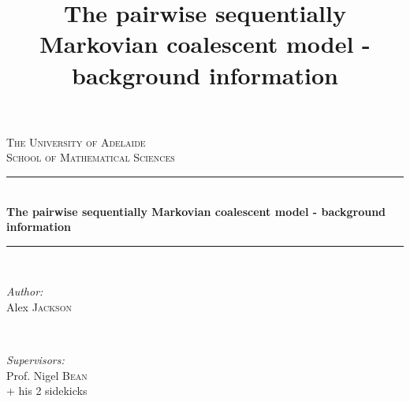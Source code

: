 \documentclass[12pt]{article}
\newcommand{\HRule}{\rule{\linewidth}{0.5mm}} %
\begin{document}
%
%


\title{The pairwise sequentially Markovian coalescent model - background information}



\begin{titlepage}
	
	\center %

	\textsc{\Large The University of Adelaide}\\[2cm] %
	\textsc{\LARGE School of Mathematical Sciences}\\[1cm] %


	\HRule \\[0.4cm]
	{ \huge \bfseries The pairwise sequentially Markovian coalescent model - background information}\\[0.4cm] %
	\HRule \\[1.5cm]

	
	\begin{minipage}{0.50\textwidth}
		\begin{flushleft} \large
			\emph{Author:}\\
            Alex \textsc{Jackson}
		\end{flushleft}
	\end{minipage}
	~
	\begin{minipage}{0.45\textwidth}
		\begin{flushright} \large
			\emph{Supervisors:} \\
			Prof. Nigel \textsc{Bean}\\ %
                        + his 2 sidekicks
		\end{flushright}
	\end{minipage}\\[1cm]
	

\end{titlepage}
\end{document}
